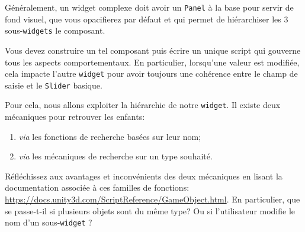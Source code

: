 \documentclass[a4paper,10pt]{article}
\newenvironment{info}%
{\begin{tcolorbox}[breakable,colback=green!5!white,colframe=green!75!black,title=Information]}%
{\end{tcolorbox}}
\begin{document}
\begin{info}
Généralement, un widget complexe doit avoir un \texttt{Panel} à la base pour servir de fond visuel, que vous opacifierez par défaut et qui permet de hiérarchiser les 3 sous-\texttt{widgets} le composant.
\end{info}

Vous devez construire un tel composant puis écrire un unique script qui gouverne tous les aspects comportementaux. En particulier, lorsqu'une valeur est modifiée, cela impacte l'autre \texttt{widget} pour avoir toujours une cohérence entre le champ de saisie et le \texttt{Slider} basique.

Pour cela, nous allons exploiter la hiérarchie de notre \texttt{widget}. Il existe deux mécaniques pour retrouver les enfants:
\begin{enumerate}
	\item \textit{via} les fonctions de recherche basées sur leur nom;
	\item \textit{via} les mécaniques de recherche sur un type souhaité.
\end{enumerate}
Réfléchissez aux avantages et inconvénients des deux mécaniques en lisant la documentation associée à ces familles de fonctions: \url{https://docs.unity3d.com/ScriptReference/GameObject.html}.
En particulier, que se passe-t-il si plusieurs objets sont du même type? Ou si l'utilisateur modifie le nom d'un sous-\texttt{widget} ?
\end{document}
